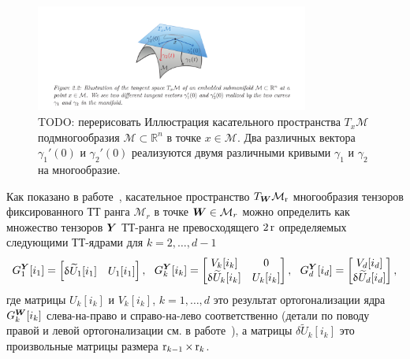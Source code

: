 \begin{figure}[t]
\begin{center}
  \includegraphics[width=0.8\textwidth]{images/tangent_space.png}
  \caption{\alert{TODO: перерисовать} Иллюстрация касательного пространства $T_x \mathcal{M}$ подмногообразия $\mathcal{M} \subset \mathbb{R}^n$ в точке $x \in \mathcal{M}$. Два различных вектора $\gamma_1'(0)$ и $\gamma_2'(0)$ реализуются двумя различными кривыми $\gamma_1$ и $\gamma_2$ на многообразие. \label{fig:tangent-space}}
  \end{center}
\end{figure}


Как показано в работе~\cite{Steinlechner2016}, касательное пространство $T_{\boldsymbol{W}} \mathcal{M}_{\operatorname{r}}$ многообразия тензоров фиксированного ТТ ранга $\mathcal{M}_r$ в точке $\boldsymbol{W} \in \mathcal{M}_r$ можно определить как множество тензоров $\boldsymbol{Y}$ ТТ-ранга не превосходящего $2 \operatorname{r}$ определяемых следующими ТТ-ядрами для $k = 2, \ldots, d-1$
\begin{equation}
	\label{eq:tangent-space}
	G_1^{\boldsymbol{Y}}[i_1] = \begin{bmatrix}
	\updelta \widetilde{U}_1[i_1] & U_1[i_1]
	\end{bmatrix}, ~~ G_k^{\boldsymbol{Y}}[i_k] = \begin{bmatrix}
	V_k[i_k] & 0\\
	\updelta \widetilde{U}_k[i_k] & U_k[i_k]\\
	\end{bmatrix}, ~~ G_d^{\boldsymbol{Y}}[i_d] = \begin{bmatrix}
	V_d[i_d]\\
	\updelta \widetilde{U}_d[i_d]\\
	\end{bmatrix},
\end{equation}
где матрицы $U_k[i_k]$ и $V_k[i_k]$, $k = 1, \ldots, d$ это результат ортогонализации ядра $G^{\boldsymbol{W}}_k[i_k]$ слева-на-право и справо-на-лево соответственно (детали по поводу правой и левой ортогонализации см. в работе~\cite{oseledets2011ttMain}), а матрицы $\delta \widetilde{U}_k[i_k]$ это произвольные матрицы размера $\operatorname{r}_{k-1} \times \operatorname{r}_k$.

